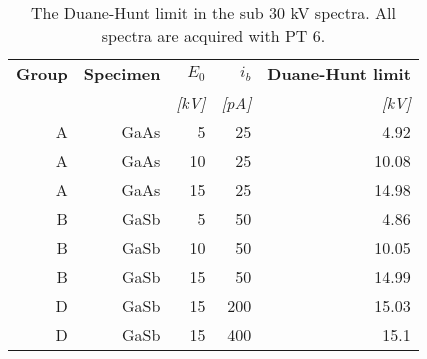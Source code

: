 \begin{table}[hbtp]
    \begin{center}
        \caption{
            The Duane-Hunt limit in the sub 30 kV spectra.
            All spectra are acquired with PT 6.
        }
        \label{tab:results:duane_hunt}
        \begin{tabular}{rrrrr}
            \hline
            \textbf{Group} & \textbf{Specimen} & \textbf{$E_0$} & \textbf{$i_b$} & \textbf{Duane-Hunt limit} \\
            \emph{}        & \emph{}           & \emph{[kV]}    & \emph{[pA]}    & \emph{[kV]}               \\
            \hline
            A              & GaAs              & 5              & 25             & 4.92                      \\
            A              & GaAs              & 10             & 25             & 10.08                     \\
            A              & GaAs              & 15             & 25             & 14.98                     \\
            B              & GaSb              & 5              & 50             & 4.86                      \\
            B              & GaSb              & 10             & 50             & 10.05                     \\
            B              & GaSb              & 15             & 50             & 14.99                     \\
            D              & GaSb              & 15             & 200            & 15.03                     \\
            D              & GaSb              & 15             & 400            & 15.1                      \\
            \hline
        \end{tabular}
    \end{center}
\end{table}
